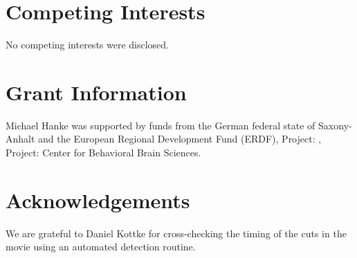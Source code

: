 \documentclass[10pt,a4paper,twocolumn]{article}
\begin{document}
\section*{Competing Interests}
No competing interests were disclosed.

\section*{Grant Information}

Michael Hanke was supported by funds from the German federal state of
Saxony-Anhalt and the European Regional Development Fund (ERDF), Project: ,
Project: Center for Behavioral Brain Sciences.

\section*{Acknowledgements}
We are grateful to Daniel Kottke for cross-checking the timing of the cuts in
the movie using an automated detection routine.

{\small
}
\end{document}
